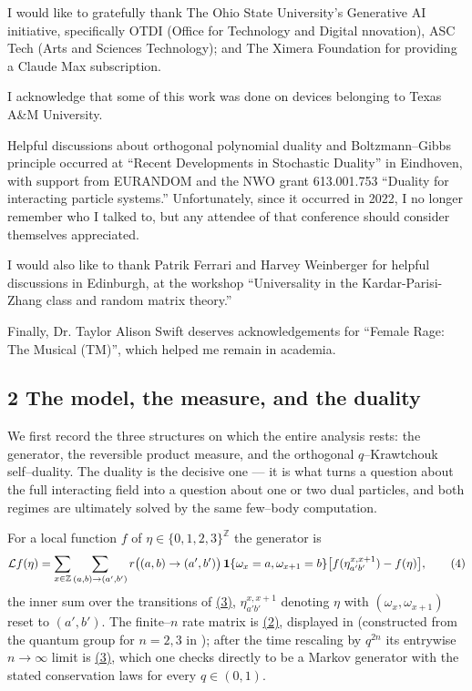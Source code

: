 \documentclass[11pt]{article}
\theoremstyle{plain}
\theoremstyle{definition}
\theoremstyle{remark}
\newcommand{\Z}{\mathbb{Z}}\newcommand{\R}{\mathbb{R}}\newcommand{\N}{\mathbb{N}}
\newcommand{\cL}{\mathcal L}\newcommand{\cO}{\mathcal O}\newcommand{\cE}{\mathcal E}
\begin{document}
I would like to gratefully thank The Ohio State University's Generative AI initiative, specifically OTDI (Office for Technology and Digital nnovation), ASC Tech (Arts and Sciences Technology); and The Ximera Foundation for providing a Claude Max subscription.

I acknowledge that some of this work was done on devices belonging to Texas A\&M University.

Helpful discussions about orthogonal polynomial duality and Boltzmann–Gibbs principle occurred at ``Recent Developments in Stochastic Duality'' in Eindhoven, with support from EURANDOM and the NWO grant 613.001.753 ``Duality for interacting particle systems.'' Unfortunately, since it occurred in 2022, I no longer remember who I talked to, but any attendee of that conference should consider themselves appreciated.
 
I would also like to thank Patrik Ferrari and Harvey Weinberger for helpful discussions in Edinburgh, at the workshop ``Universality in the Kardar-Parisi-Zhang class and random matrix theory.''

Finally, Dr. Taylor Alison Swift deserves acknowledgements for ``Female Rage: The Musical (TM)'', which helped me remain in academia. 



\subsection{2 The model, the measure, and the duality}\label{sec_model}

We first record the three structures on which the entire analysis rests: the generator,
the reversible product measure, and the orthogonal $q$--Krawtchouk self--duality. The
duality is the decisive one --- it is what turns a question about the full interacting
field into a question about one or two dual particles, and both regimes are ultimately
solved by the same few--body computation.

For a local function $f$ of $\eta\in\{0,1,2,3\}^\Z$ the generator is
\label{eq_gen}
\begin{equation}
  \cL f(\eta)=\sum_{x\in\Z}\sum_{(a,b)\to(a',b')}
   r\big((a,b)\to(a',b')\big)\,\bone\{\omega_x=a,\omega_{x+1}=b\}
   \big[f(\eta^{x,x+1}_{a'b'})-f(\eta)\big],\qquad(4)
\end{equation}
the inner sum over the transitions of \hyperref[eq_rates]{(3)}, $\eta^{x,x+1}_{a'b'}$ denoting
$\eta$ with $(\omega_x,\omega_{x+1})$ reset to $(a',b')$. The finite--$n$ rate matrix
is \hyperref[eq_nrates]{(2)}, displayed in \cite[\S2.1]{REU} (constructed from the quantum
group for $n=2,3$ in \cite{KLLPZ}); after the time rescaling by $q^{2n}$ its entrywise
$n\to\infty$ limit is \hyperref[eq_rates]{(3)}, which one checks directly to be a Markov
generator with the stated conservation laws for every $q\in(0,1)$.
\end{document}
